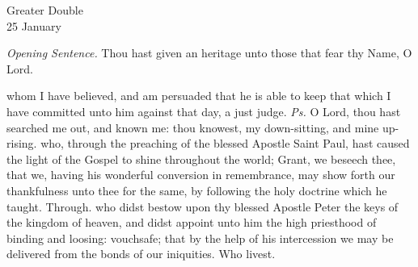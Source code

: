\begin{inhead}
    {Greater Double\\
25 January}
\end{inhead}
\par\noindent
\textit{Opening Sentence.} Thou hast given an heritage unto those that fear thy Name, O Lord.%

\introit
{} whom I have believed, and am persuaded that he is able to keep that which I have committed unto him against that day, a just judge. \textit{Ps.} O Lord, thou hast searched me out, and known me: thou knowest, my down-sitting, and mine up-rising.
\collect
{} who, through the preaching of the blessed Apostle Saint Paul, hast caused the light of the Gospel to shine throughout the world; Grant, we beseech thee, that we, having his wonderful conversion in remembrance, may show forth our thankfulness unto thee for the same, by following the holy doctrine which he taught. Through.
 who didst bestow upon thy blessed Apostle Peter the keys of the kingdom of heaven, and didst appoint unto him the high priesthood of binding and loosing: vouchsafe; that by the help of his intercession we may be delivered from the bonds of our iniquities. Who livest.

